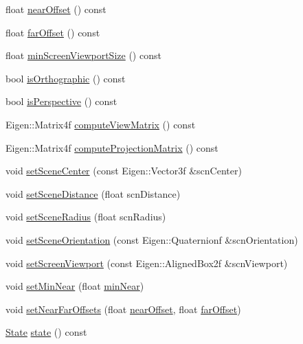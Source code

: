 \begin{DoxyCompactItemize}
float \hyperlink{class_trackball_a1e4f2903b71d3bdd8327294d4e9c58b8}{near\+Offset} () const
\item 
float \hyperlink{class_trackball_ab674f03c640a2f3d434afc4bcad241c9}{far\+Offset} () const
\item 
float \hyperlink{class_trackball_ac50d8b300e7c77162c6134986f9a8a50}{min\+Screen\+Viewport\+Size} () const
\item 
bool \hyperlink{class_trackball_a3712c12a5a5468301593a01b0df4c6be}{is\+Orthographic} () const
\item 
bool \hyperlink{class_trackball_a8199e95d37088ed5d9ba36891d70aaa7}{is\+Perspective} () const
\item 
Eigen\+::\+Matrix4f \hyperlink{class_trackball_acb8ad68c2077f4ff149e501acfe67d50}{compute\+View\+Matrix} () const
\item 
Eigen\+::\+Matrix4f \hyperlink{class_trackball_a4d156f831f9c5eac08ca40283327fb3d}{compute\+Projection\+Matrix} () const
\item 
void \hyperlink{class_trackball_a279072f30b8e41189b05ce0a1caf36a0}{set\+Scene\+Center} (const Eigen\+::\+Vector3f \&scn\+Center)
\item 
void \hyperlink{class_trackball_a20407b903581f2e34ca12592f8e0c41a}{set\+Scene\+Distance} (float scn\+Distance)
\item 
void \hyperlink{class_trackball_ab546e1363934d09d8ed292dbd8b34e51}{set\+Scene\+Radius} (float scn\+Radius)
\item 
void \hyperlink{class_trackball_a0260225e8b58034f6bbc030a35c400e1}{set\+Scene\+Orientation} (const Eigen\+::\+Quaternionf \&scn\+Orientation)
\item 
void \hyperlink{class_trackball_aac926ad4f5144195a88b47203e3b5ca7}{set\+Screen\+Viewport} (const Eigen\+::\+Aligned\+Box2f \&scn\+Viewport)
\item 
void \hyperlink{class_trackball_a0b23783bdc371a21bce72b633bc1c27a}{set\+Min\+Near} (float \hyperlink{class_trackball_ae10b18ba9b38e588e996e35a709bab29}{min\+Near})
\item 
void \hyperlink{class_trackball_adb8173ceaf1d83d324751a6379f769ef}{set\+Near\+Far\+Offsets} (float \hyperlink{class_trackball_a1e4f2903b71d3bdd8327294d4e9c58b8}{near\+Offset}, float \hyperlink{class_trackball_ab674f03c640a2f3d434afc4bcad241c9}{far\+Offset})
\item 
\hyperlink{class_trackball_a102216413a87cb37801044063a1b05be}{State} \hyperlink{class_trackball_af8dc66630b00cd3d92b999630691ff05}{state} () const
\item 

\end{DoxyCompactItemize}

